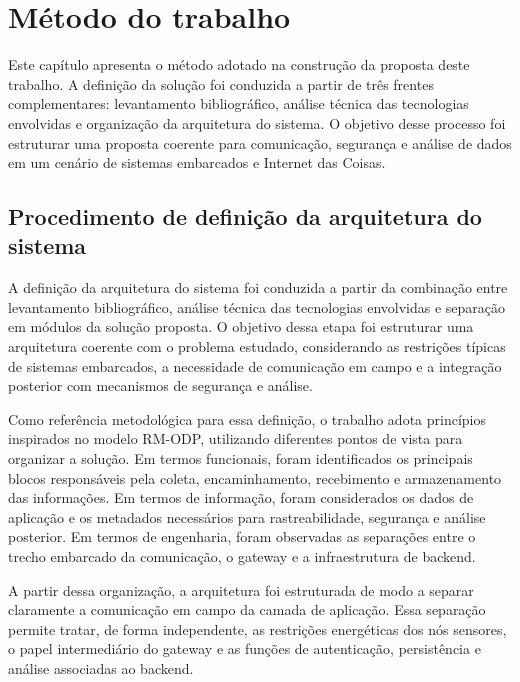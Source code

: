 \chapter{Método do trabalho} \label{cap:metodo}

Este capítulo apresenta o método adotado na construção da proposta deste trabalho. A definição da solução foi conduzida a partir de três frentes complementares: levantamento bibliográfico, análise técnica das tecnologias envolvidas e organização da arquitetura do sistema. O objetivo desse processo foi estruturar uma proposta coerente para comunicação, segurança e análise de dados em um cenário de sistemas embarcados e Internet das Coisas.


\section{Procedimento de definição da arquitetura do sistema}

A definição da arquitetura do sistema foi conduzida a partir da combinação entre levantamento bibliográfico, análise técnica das tecnologias envolvidas e separação em módulos da solução proposta. O objetivo dessa etapa foi estruturar uma arquitetura coerente com o problema estudado, considerando as restrições típicas de sistemas embarcados, a necessidade de comunicação em campo e a integração posterior com mecanismos de segurança e análise.

Como referência metodológica para essa definição, o trabalho adota princípios inspirados no modelo RM-ODP, utilizando diferentes pontos de vista para organizar a solução. Em termos funcionais, foram identificados os principais blocos responsáveis pela coleta, encaminhamento, recebimento e armazenamento das informações. Em termos de informação, foram considerados os dados de aplicação e os metadados necessários para rastreabilidade, segurança e análise posterior. Em termos de engenharia, foram observadas as separações entre o trecho embarcado da comunicação, o gateway e a infraestrutura de backend.

A partir dessa organização, a arquitetura foi estruturada de modo a separar claramente a comunicação em campo da camada de aplicação. Essa separação permite tratar, de forma independente, as restrições energéticas dos nós sensores, o papel intermediário do gateway e as funções de autenticação, persistência e análise associadas ao backend.

